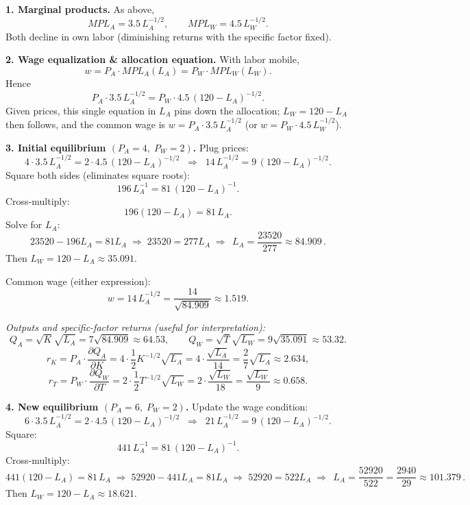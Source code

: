 \documentclass[12pt]{article}
\begin{document}
\bigskip

\noindent \textbf{1. Marginal products.} As above,
\[
MPL_A=3.5\,L_A^{-1/2},\qquad MPL_W=4.5\,L_W^{-1/2}.
\]
Both decline in own labor (diminishing returns with the specific factor fixed).

\bigskip

\noindent \textbf{2. Wage equalization \& allocation equation.} With labor mobile,
\[
w=P_A\cdot MPL_A(L_A)=P_W\cdot MPL_W(L_W).
\]
Hence
\[
P_A\cdot 3.5\,L_A^{-1/2}=P_W\cdot 4.5\, (120-L_A)^{-1/2}.
\]
Given prices, this single equation in $L_A$ pins down the allocation; $L_W=120-L_A$ then follows, and the common wage is $w=P_A\cdot 3.5\,L_A^{-1/2}$ (or $w=P_W\cdot 4.5\,L_W^{-1/2}$).

\bigskip

\noindent \textbf{3. Initial equilibrium $(P_A=4,\;P_W=2)$.} Plug prices:
\[
4\cdot 3.5\,L_A^{-1/2}=2\cdot 4.5\,(120-L_A)^{-1/2}
\;\;\Longrightarrow\;\;
14\,L_A^{-1/2}=9\,(120-L_A)^{-1/2}.
\]
Square both sides (eliminates square roots):
\[
196\,L_A^{-1}=81\,(120-L_A)^{-1}.
\]
Cross-multiply:
\[
196(120-L_A)=81\,L_A.
\]
Solve for $L_A$:
\[
23520-196L_A=81L_A
\;\Rightarrow\;
23520=277L_A
\;\Rightarrow\;
\boxed{\,L_A=\frac{23520}{277}\approx 84.909\,}.
\]
Then $L_W=120-L_A\approx \boxed{35.091}$.

Common wage (either expression):
\[
w=14\,L_A^{-1/2}=\frac{14}{\sqrt{84.909}}\approx \boxed{1.519}.
\]

\emph{Outputs and specific-factor returns (useful for interpretation):}
\[
Q_A=\sqrt{K}\sqrt{L_A}=7\sqrt{84.909}\approx \boxed{64.53},\qquad
Q_W=\sqrt{T}\sqrt{L_W}=9\sqrt{35.091}\approx \boxed{53.32}.
\]
\[
r_K=P_A\cdot \frac{\partial Q_A}{\partial K}
=4\cdot \frac{1}{2}K^{-1/2}\sqrt{L_A}
=4\cdot \frac{\sqrt{L_A}}{14}
=\frac{2}{7}\sqrt{L_A}\approx \boxed{2.634},
\]
\[
r_T=P_W\cdot \frac{\partial Q_W}{\partial T}
=2\cdot \frac{1}{2}T^{-1/2}\sqrt{L_W}
=2\cdot \frac{\sqrt{L_W}}{18}
=\frac{\sqrt{L_W}}{9}\approx \boxed{0.658}.
\]

\bigskip

\noindent \textbf{4. New equilibrium $(P_A=6,\;P_W=2)$.} Update the wage condition:
\[
6\cdot 3.5\,L_A^{-1/2}=2\cdot 4.5\,(120-L_A)^{-1/2}
\;\;\Longrightarrow\;\;
21\,L_A^{-1/2}=9\,(120-L_A)^{-1/2}.
\]
Square:
\[
441\,L_A^{-1}=81\,(120-L_A)^{-1}.
\]
Cross-multiply:
\[
441(120-L_A)=81\,L_A
\;\Rightarrow\;
52920-441L_A=81L_A
\;\Rightarrow\;
52920=522L_A
\;\Rightarrow\;
\boxed{\,L_A=\frac{52920}{522}=\frac{2940}{29}\approx 101.379\,}.
\]
Then $L_W=120-L_A\approx \boxed{18.621}$.
\end{document}
